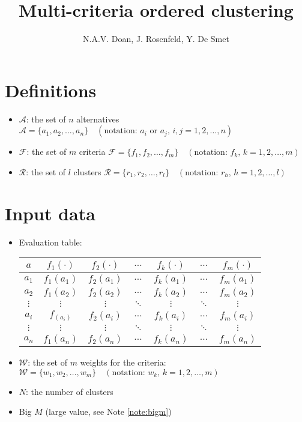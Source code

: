\documentclass[a4paper]{article}
\title{Multi-criteria ordered clustering}
\author{N.A.V. Doan, J. Rosenfeld, Y. De Smet}
\date{}
\begin{document}
    \maketitle
    \section{Definitions}
    \begin{itemize}
        \item $\mathcal{A}$: the set of $n$ alternatives $\mathcal{A} = \{a_1, a_2, \dots, a_n\} \quad (\text{notation: } a_i \text{ or } a_j,\, i,j = 1, 2, \dots, n)$
        \item $\mathcal{F}$: the set of $m$ criteria $\mathcal{F} = \{f_1, f_2, \dots, f_m\} \quad (\text{notation: } f_k,\, k = 1, 2, \dots, m)$
        \item $\mathcal{R}$: the set of $l$ clusters $\mathcal{R} = \{r_1, r_2, \dots, r_l\} \quad (\text{notation: } r_h,\, h = 1, 2, \dots, l)$
    \end{itemize}
    \section{Input data}
    \begin{itemize}
        \item Evaluation table: \begin{tabular}{c|cccccc}
            $a$ & $f_1(\cdot)$ & $f_2(\cdot)$ & $\dots$ & $f_k(\cdot)$ & $\dots$ & $f_m(\cdot)$\\
            \hline
            $a_1$ & $f_1(a_1)$ & $f_2(a_1)$ & $\dots$ & $f_k(a_1)$ & $\dots$ & $f_m(a_1)$\\
            $a_2$ & $f_1(a_2)$ & $f_2(a_2)$ & $\dots$ & $f_k(a_2)$ & $\dots$ & $f_m(a_2)$\\
            $\vdots$ & $\vdots$ & $\vdots$ & $\ddots$ & $\vdots$ & $\ddots$ & $\vdots$\\
            $a_i$ & $f_(a_i)$ & $f_2(a_i)$ & $\dots$ & $f_k(a_i)$ & $\dots$ & $f_m(a_i)$\\
            $\vdots$ & $\vdots$ & $\vdots$ & $\ddots$ & $\vdots$ & $\ddots$ & $\vdots$\\
            $a_n$ & $f_1(a_n)$ & $f_2(a_n)$ & $\dots$ & $f_k(a_n)$ & $\dots$ & $f_m(a_n)$\\
        \end{tabular}
        \item $\mathcal{W}$: the set of $m$ weights for the criteria: $\mathcal{W} = \{w_1, w_2, \dots, w_m\} \quad (\text{notation: } w_k,\, k = 1, 2, \dots, m)$
        \item $N$: the number of clusters
        \item Big $M$ (large value, see Note \ref{note:bigm})
    \end{itemize}
\end{document}

